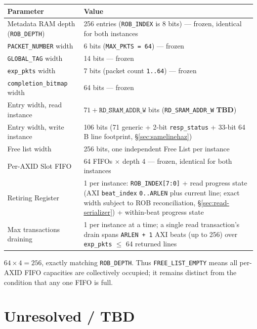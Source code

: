 \begin{center}
\begin{tabular}{ll}
\toprule
\textbf{Parameter} & \textbf{Value} \\
\midrule
Metadata RAM depth (\texttt{ROB\_DEPTH}) & 256 entries (\texttt{ROB\_INDEX} is 8 bits) --- frozen, identical for both instances \\
\texttt{PACKET\_NUMBER} width & 6 bits (\texttt{MAX\_PKTS = 64}) --- frozen \\
\texttt{GLOBAL\_TAG} width    & 14 bits --- frozen \\
\texttt{exp\_pkts} width      & 7 bits (packet count \texttt{1..64}) --- frozen \\
\texttt{completion\_bitmap} width & 64 bits --- frozen \\
Entry width, read instance    & \(71 + \texttt{RD\_SRAM\_ADDR\_W}\) bits (\texttt{RD\_SRAM\_ADDR\_W} \textbf{TBD}) \\
Entry width, write instance   & 106 bits (71 generic + 2-bit \texttt{resp\_status} + 33-bit 64\,B line footprint, \S\ref{sec:samelinehaz}) \\
Free list width          & 256 bits, one independent Free List per instance \\
Per-AXID Slot FIFO        & 64 FIFOs $\times$ depth 4 --- frozen, identical for both instances \\
Retiring Register         & 1 per instance: \texttt{ROB\_INDEX[7:0]} + read progress state (AXI \texttt{beat\_index} \texttt{0..ARLEN} plus current line; exact width subject to ROB reconciliation, \S\ref{sec:read-serializer}) + within-beat progress state \\
Max transactions draining & 1 per instance at a time; a single read transaction's drain spans \texttt{ARLEN + 1} AXI beats (up to 256) over \texttt{exp\_pkts} $\le$ 64 returned lines \\
\bottomrule
\end{tabular}
\end{center}

\noindent \(64 \times 4 = 256\), exactly matching \texttt{ROB\_DEPTH}. Thus \texttt{FREE\_LIST\_EMPTY} means all per-AXID FIFO capacities are collectively occupied; it remains distinct from the condition that any one FIFO is full.

\section{Unresolved / TBD}
\label{sec:tbd}

